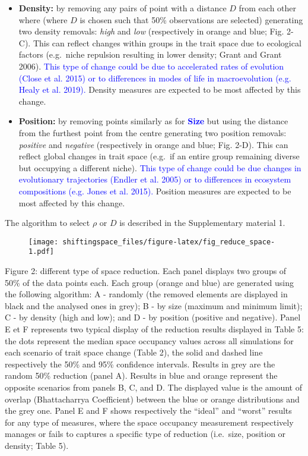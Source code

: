 \documentclass[]{article}
\begin{document}
\begin{itemize}
\item
  \textbf{Density:} by removing any pairs of point with a distance \(D\)
  from each other where (where \(D\) is chosen such that 50\%
  observations are selected) generating two density removals:
  \emph{high} and \emph{low} (respectively in orange and blue; Fig.
  2-C). This can reflect changes within groups in the trait space due to
  ecological factors (e.g.~niche repulsion resulting in lower density;
  Grant and Grant 2006). \textcolor{blue}{This type of
  change could be due to accelerated rates of evolution (Close et al.
  2015) or to differences in modes of life in macroevolution (e.g. Healy
  et al. 2019).} Density measures are expected to be most affected by
  this change.
\item
  \textbf{Position:} by removing points similarly as for
  \textbf{\textcolor{blue}{Size}} but using the
  distance from the furthest point from the centre generating two
  position removals: \emph{positive} and \emph{negative} (respectively
  in orange and blue; Fig. 2-D). This can reflect global changes in
  trait space (e.g.~if an entire group remaining diverse but occupying a
  different niche). \textcolor{blue}{This type of
  change could be due changes in evolutionary trajectories (Endler et
  al. 2005) or to differences in ecosystem compositions (e.g. Jones et
  al. 2015).} Position measures are expected to be most affected by
  this change.
\end{itemize}

The algorithm to select \(\rho\) or \(D\) is described in the
Supplementary material 1.

\renewcommand\baselinestretch{1}\selectfont

\begin{figure}
\centering
\texttt{[image: shiftingspace\_files/figure-latex/fig\_reduce\_space-1.pdf]}
\caption{}
\end{figure}

Figure 2: different type of space reduction. Each panel displays two
groups of 50\% of the data points each. Each group (orange and blue) are
generated using the following algorithm: A - randomly (the removed
elements are displayed in black and the analysed ones in grey); B - by
size (maximum and minimum limit); C - by density (high and low); and D -
by position (positive and negative). Panel E et F represents two typical
display of the reduction results displayed in Table 5: the dots
represent the median space occupancy values across all simulations for
each scenario of trait space change (Table 2), the solid and dashed line
respectively the 50\% and 95\% confidence intervals. Results in grey are
the random 50\% reduction (panel A). Results in blue and orange
represent the opposite scenarios from panels B, C, and D. The displayed
value is the amount of overlap (Bhattacharrya Coefficient) between the
blue or orange distributions and the grey one. Panel E and F shows
respectively the ``ideal'' and ``worst'' results for any type of
measures, where the space occupancy measurement respectively manages or
fails to captures a specific type of reduction (i.e.~size, position or
density; Table 5).
\end{document}
